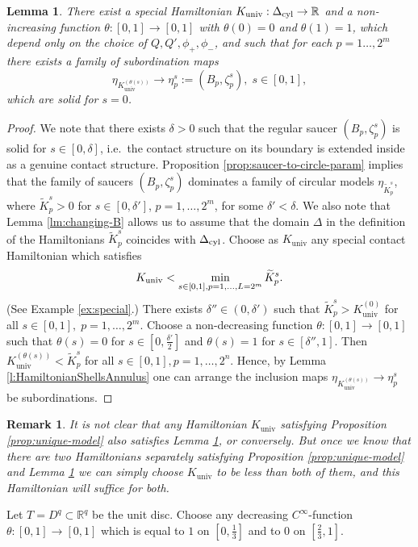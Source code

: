 \documentclass[12pt]{paper}
\theoremstyle{plain}
\newtheorem{lemma}[theorem]{Lemma}
\newtheorem{remark}[theorem]{Remark}
\theoremstyle{definition}
\newcommand{\wt}{\widetilde}
\newcommand{\R}{{\mathbb{R}}}
\newcommand{\cyl}{{\rm cyl}}
\renewcommand{\min}{{\rm min}}
\newcommand{\univ}{\mathrm{univ}}
\numberwithin{figure}{section}
\begin{document}
\begin{lemma}\label{lm:universal-eps}
There exist a special Hamiltonian $K_\univ:\Delta_\cyl\to\R$ and a non-increasing function   $\theta:[0,1]\to[0,1]$ with  
  $\theta(0)=0$ and $\theta(1)=1$,  which depend  only on the choice of
$Q,Q',\phi_+,\phi_- $,  and such that for each $p=1\dots, 2^m$
 there exists     a family of subordination
maps $$\eta_{K^{(\theta(s))}_{\univ}}\to\eta^{s}_p:=(B_p,\zeta^{s}_p), \;  s\in[0,1], $$ 
  which are solid for $s=0$.
 \end{lemma}
\begin{proof}    We note that there exists $\delta>0$ such that the regular saucer $(B_p,\zeta^{s}_p)$ is solid for $s\in[0,\delta]$, i.e.\ the contact structure on its boundary is extended inside as a genuine contact structure.
Proposition \ref{prop:saucer-to-circle-param} implies that   the family of    saucers  $(B_p,\zeta^{s}_p)$ dominates a family of  circular models $\eta_{\wt K^{s}_p}$, where $\wt K^{s}_p>0$ for  $s\in[0,\delta']$, $p=1,\dots, 2^m$, for some $\delta'<\delta$. 
 We also  note that Lemma \ref{lm:changing-B} allows us to assume that  the domain $\Delta$ in the definition of the Hamiltonians $\wt K_p^{s}$ coincides with    $\Delta_\cyl$.  Choose as $K_\univ$ any  special contact Hamiltonian which satisfies 
 $$K_\univ<\mathop{\min}\limits_{s\in[0,1],p=1,\dots, L=2^m}\wt K^s_p.$$ (See Example \ref{ex:special}.) There exists $\delta''\in(0,\delta')$ such that $\wt K^s_p>K^{(0)}_\univ$ for all $s\in[0,1],\; p=1,\dots, 2^m$.
 Choose a non-decreasing function $\theta:[0,1]\to[0,1]$ such that
 $\theta(s)=0$ for $s\in[0,\tfrac{\delta'}2]$ and $\theta(s)=1$ for $s\in[\delta'',1]$. Then $K_\univ^{(\theta(s))}<\wt K^s_p$ for all $s\in[0,1], p=1,\dots, 2^n$. Hence, by Lemma  \ref{l:HamiltonianShellsAnnulus} one can arrange the inclusion maps
 $\eta_{K_\univ^{(\theta(s))}}\to \eta^s_p$ be subordinations.
   \end{proof} 
 
 \begin{remark}
{\rm It is not clear that any Hamiltonian $K_\univ$ satisfying Proposition \ref{prop:unique-model} also satisfies Lemma \ref{lm:universal-eps}, or conversely. But once we know that there are two Hamiltonians separately satisfying Proposition \ref{prop:unique-model} and Lemma \ref{lm:universal-eps} we can simply choose $K_\univ$ to be less than both of them, and this Hamiltonian will suffice for both.}
\end{remark}
 
 Let  $T=D^q\subset\R^q$ be the unit disc. Choose any decreasing $C^\infty$-function $\theta:[0,1]\to [0,1]$ which is equal to $1$ on $[0,\frac13]$ and to $0$ on $[\frac23,1]$.
 
\end{document}
